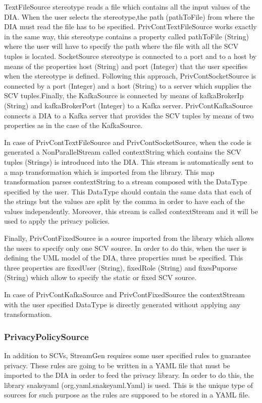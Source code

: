 TextFileSource stereotype reads a file which contains all the input values of the DIA. When the user selects the stereotype,the path (pathToFile) from where the DIA must read the file has to be specified. PrivContTextFileSource works exactly in the same way, this stereotype contains a property called pathToFile (String) where the user will have to specify the path where the file with all the SCV tuples is located. SocketSource stereotype is connected to a port and to a host by means of the properties host (String) and port (Integer) that the user specifies when the stereotype is defined. Following this approach, PrivContSocketSource is connected by a port (Integer) and a host (String) to a server which supplies the SCV tuples.Finally, the KafkaSource is connected by means of kafkaBrokerIp (String) and kafkaBrokerPort (Integer) to a Kafka server. PrivContKafkaSource connects a DIA to a Kafka server that provides the SCV tuples by means of two properties as in the case of the KafkaSource.

In case of PrivContTextFileSource and PrivContSocketSource, when the code is generated a NonParallelStream called contextString which contains the SCV tuples (Strings) is introduced into the DIA. This stream is automatically sent to a map transformation which is imported from the library. This map transformation parses contextString to a stream composed with the DataType specified by the user. This DataType should contain the same data that each of the strings but the values are split by the comma in order to have each of the values independently. Moreover, this stream is called contextStream and it will be used to apply the privacy policies.

Finally, PrivContFixedSource is a source imported from the library which allows the users to specify only one SCV source. In order to do this, when the user is defining the UML model of the DIA, three properties must be specified. This three properties are fixedUser (String), fixedRole (String) and fixesPuporse (String) which allow to specify the static or fixed SCV source.

In case of PrivContKafkaSource and PrivContFixedSource the contextStream with the user specified DataType is directly generated without applying any transformation.

\subsubsection{PrivacyPolicySource}

In addition to SCVs, StreamGen requires some user specified rules to guarantee privacy. These rules are going to be written in a YAML file that must be imported to the DIA in order to feed the privacy library. In order to do this, the library snakeyaml (org.yaml.snakeyaml.Yaml) is used. This is the unique type of sources for such purpose as the rules are supposed to be stored in a YAML file.

